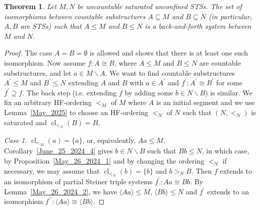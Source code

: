 \documentclass[a4paper, 11pt]{article}
\DeclareMathOperator{\cl}{cl}
\theoremstyle{note}
\newtheorem{thm}{Theorem}[section]
\begin{document}
\begin{thm} \label{May_26_2024_4} Let $M,N$ be uncountable saturated unconfined STSs. The set of isomorphisms between countable substructures $A\subseteq M$ and $B\subseteq N$  (in particular,  $A,B$ are STSs)  such that $A\leq M$ and $B\leq N$ is a back-and-forth system between $M$ and $N$.
\end{thm}	
\begin{proof} 
	
 The  case $A=B=\emptyset$ is allowed and shows that there is at least one such isomorphism.  Now assume $f:A\cong B$, where $A\leq M$ and $B\leq N$ are  countable substructures, and let $a\in M\smallsetminus A$. We want to find countable substructures $A^\prime \leq M$ and $B^\prime \leq N$ extending $A$ and $B$ with $a \in A^\prime$  and $f^\prime: A^\prime\cong B^\prime$ for some $f^\prime\supseteq f$. The back step (i.e. extending $f$ by adding some $b\in N\smallsetminus B$) is similar.   We fix an arbitrary HF-ordering $<_M$ of $M$  where $A$ is an initial segment and we use Lemma~\ref{May_2025} to choose an HF-ordering $<_N$ of $N$ such that $(N,<_N)$ is saturated and $\cl_{<_N}(B)=B$. 
	
	\emph{Case 1}.  $\cl_{<_M}(a)=\{a\}$, or, equivalently,  $Aa\leq M$. Corollary~\ref{June_25_2024_4} gives $b\in N\smallsetminus B$ such that  $Bb\leq N$, in which case, by Proposition~\ref{May_26_2024_1} and  by changing the ordering $<_N$ if necessary,   we may assume that $\cl_{<_N}(b)=\{b\}$  and $b>_N B$.  Then $f$ extends to an isomorphism of partial Steiner triple systems $f^\prime:Aa\cong Bb$. By Lemma~\ref{May_26_2024_2},   we have $\langle Aa\rangle\leq M$, $\langle Bb\rangle\leq  N$ and  $f^\prime$ extends to an isomorphism  $f^{\prime\prime}:\langle Aa\rangle \cong \langle Bb\rangle$.
	

\end{proof}
\end{document}
